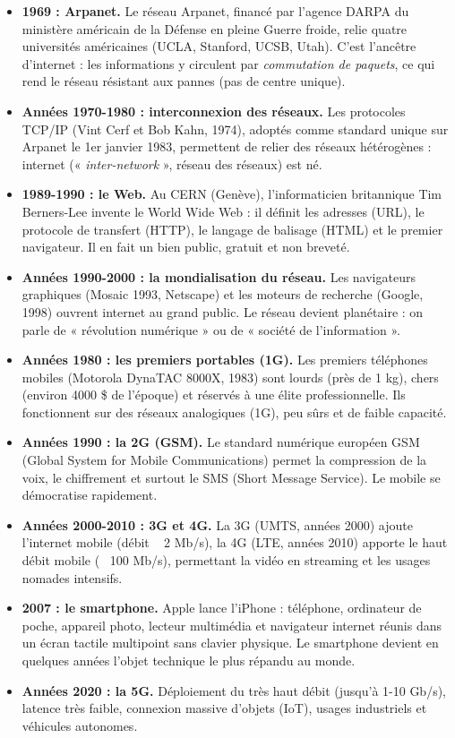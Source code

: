 \documentclass[11pt]{article}
\newcommand{\cle}[1]{{\popxbold\color{popdark}#1}}
\newcounter{popsec}
\newcounter{popsub}
\newcommand{\courssub}[1]{%
  \stepcounter{popsub}%
  \par\vspace{9pt}\noindent{\popxbold\fontsize{11.5}{13}\selectfont\color{popink}{\color{poporange}\thepopsec.\thepopsub}\hspace{6pt}#1}\par\nopagebreak\vspace{4pt}
}
\begin{document}
\begin{itemize}
\item \textbf{1969 : Arpanet.} Le réseau \cle{Arpanet}, financé par l'agence DARPA du ministère américain de la Défense en pleine Guerre froide, relie quatre universités américaines (UCLA, Stanford, UCSB, Utah). C'est l'ancêtre d'internet : les informations y circulent par \emph{commutation de paquets}, ce qui rend le réseau résistant aux pannes (pas de centre unique).
\item \textbf{Années 1970-1980 : interconnexion des réseaux.} Les protocoles \cle{TCP/IP} (Vint Cerf et Bob Kahn, 1974), adoptés comme standard unique sur Arpanet le 1er janvier 1983, permettent de relier des réseaux hétérogènes : internet (« \emph{inter-network} », réseau des réseaux) est né.
\item \textbf{1989-1990 : le Web.} Au CERN (Genève), l'informaticien britannique \cle{Tim Berners-Lee} invente le World Wide Web : il définit les adresses (URL), le protocole de transfert (HTTP), le langage de balisage (HTML) et le premier navigateur. Il en fait un bien public, gratuit et non breveté.
\item \textbf{Années 1990-2000 : la mondialisation du réseau.} Les navigateurs graphiques (Mosaic 1993, Netscape) et les moteurs de recherche (Google, 1998) ouvrent internet au grand public. Le réseau devient planétaire : on parle de « révolution numérique » ou de « société de l'information ».
\end{itemize}

\courssub{La téléphonie mobile : du portable au smartphone}

\begin{itemize}
\item \textbf{Années 1980 : les premiers portables (1G).} Les premiers téléphones mobiles (Motorola DynaTAC 8000X, 1983) sont lourds (près de 1 kg), chers (environ 4000 \$ de l'époque) et réservés à une élite professionnelle. Ils fonctionnent sur des réseaux analogiques (1G), peu sûrs et de faible capacité.
\item \textbf{Années 1990 : la 2G (GSM).} Le standard numérique européen \cle{GSM} (Global System for Mobile Communications) permet la compression de la voix, le chiffrement et surtout le \cle{SMS} (Short Message Service). Le mobile se démocratise rapidement.
\item \textbf{Années 2000-2010 : 3G et 4G.} La 3G (UMTS, années 2000) ajoute l'internet mobile (débit ~ 2 Mb/s), la 4G (LTE, années 2010) apporte le haut débit mobile (~ 100 Mb/s), permettant la vidéo en streaming et les usages nomades intensifs.
\item \textbf{2007 : le smartphone.} Apple lance l'\cle{iPhone} : téléphone, ordinateur de poche, appareil photo, lecteur multimédia et navigateur internet réunis dans un écran tactile multipoint sans clavier physique. Le smartphone devient en quelques années l'objet technique le plus répandu au monde.
\item \textbf{Années 2020 : la 5G.} Déploiement du très haut débit (jusqu'à 1-10 Gb/s), latence très faible, connexion massive d'objets (IoT), usages industriels et véhicules autonomes.
\end{itemize}
\end{document}
